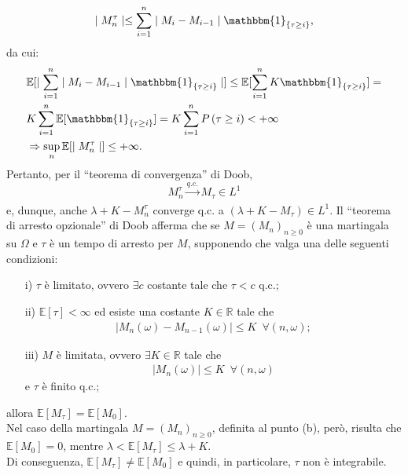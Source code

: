 \documentclass[12pt]{homework}
\begin{document}
\begin{enumerate}
\begin{alphaparts}
    \begin{equation*}
    \mid M_{n}^{\tau}\mid \leq \sum_{i=1}^{n}\mid M_{i}-M_{i-1}\mid \mathbbm{1}_{\{\tau\geq i\}},
    \end{equation*}
    da cui:
    \begin{align*}
    &\mathbb{E}[\mid\sum_{i=1}^{n}\mid M_{i}-M_{i-1}\mid \mathbbm{1}_{\{\tau\geq i\}}\mid]\leq \mathbb{E}[\sum_{i=1}^{n}K\mathbbm{1}_{\{\tau\geq i\}}]=\\
    &K\sum_{i=1}^{n}\mathbb{E}[\mathbbm{1}_{\{\tau\geq i\}}]=K\sum_{i=1}^{n}P\left(\tau\geq i\right)<+\infty \\
 &\Rightarrow \sup_{n}{\mathbb{E}[\mid M_{n}^{\tau}\mid]}\leq +\infty.   
    \end{align*}
    Pertanto, per il ``teorema di convergenza'' di Doob,
    \begin{equation*}
    M_{n}^{\tau}\xrightarrow[]{q.c.} M_{\tau}\in L^{1}    
    \end{equation*}
    e, dunque, anche $\lambda +K-M_{n}^{\tau}$ converge q.c. a $\left(\lambda + K-M_{\tau}\right) \in L^{1}$.
    \questionpart
    Il ``teorema di arresto opzionale'' di Doob afferma che se $M=\left(M_{n}\right)_{n\geq 0}$ è una martingala su $\Omega$ e $\tau$ è un tempo di arresto per $M$, supponendo che valga una delle seguenti condizioni:
    \begin{itemize}
    \item[i)]
    $\tau$ è limitato, ovvero $\exists c$ costante tale che $\tau < c$ q.c.;
    \item[ii)]
    $\mathbb{E}[\tau]<\infty$ ed esiste una costante $K\in \mathbb{R}$ tale che
    \begin{align*}
    \mid M_{n}\left(\omega\right)-M_{n-1}\left(\omega\right)\mid \leq K \,\,\, \forall\left(n,\omega\right);
\end{align*}      
\item[iii)]
$M$ è limitata, ovvero $\exists K \in \mathbb{R}$ tale che
\begin{align*}
\mid M_{n}\left(\omega\right)\mid \leq K \,\,\, \forall\left(n,\omega\right)
\end{align*}
e $\tau$ è finito q.c.;
    \end{itemize}
    allora $\mathbb{E}[M_{\tau}]=\mathbb{E}[M_{0}]$.\\
    Nel caso della martingala $M=\left(M_{n}\right)_{n\geq 0}$, definita al punto (b), però, risulta che $\mathbb{E}[M_{0}]=0$, mentre $\lambda<\mathbb{E}[M_{\tau}]\leq \lambda + K$.\\
    Di conseguenza, $\mathbb{E}[M_{\tau}]\neq\mathbb{E}[M_{0}]$ e quindi, in particolare, $\tau$ non è integrabile. 
  \end{alphaparts}
  \end{enumerate}
  
\end{document}

